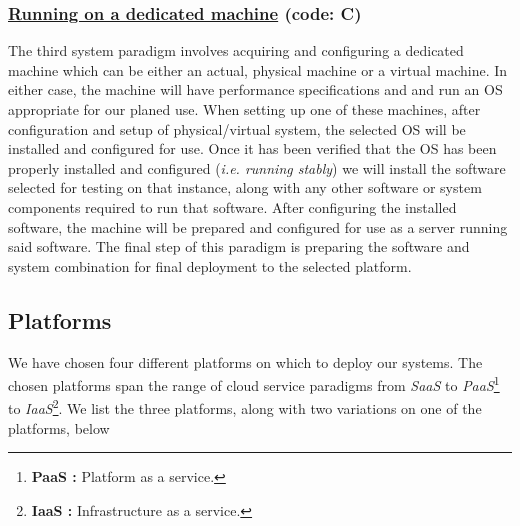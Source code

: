 \subsubsection{\underline{Running on a dedicated machine} (code: \textbf{C}) }

The third system paradigm involves acquiring and configuring a dedicated machine which can be either an actual, physical machine or a virtual machine.  In either case, the machine will have performance specifications and and run an OS appropriate for our planed use.  When setting up one of these machines, after configuration and setup of physical/virtual system, the selected OS will be installed and configured for use.  Once it has been verified that the OS has been properly installed and configured (\emph{i.e. running stably}) we will install the software selected for testing on that instance, along with any other software or system components required to run that software.  After configuring the installed software, the machine will be prepared and configured for use as a server running said software.  The final step of this paradigm is preparing the software and system combination for final deployment to the selected platform.





\subsection{Platforms}

We have chosen four different platforms on which to deploy our systems.  The chosen platforms span the range of cloud service paradigms from \emph{SaaS} to \emph{PaaS}\footnote{\textbf{PaaS :} Platform as a service.} to \emph{IaaS}\footnote{\textbf{IaaS :} Infrastructure as a service.}.  We list the three platforms, along with two variations on one of the platforms, below

